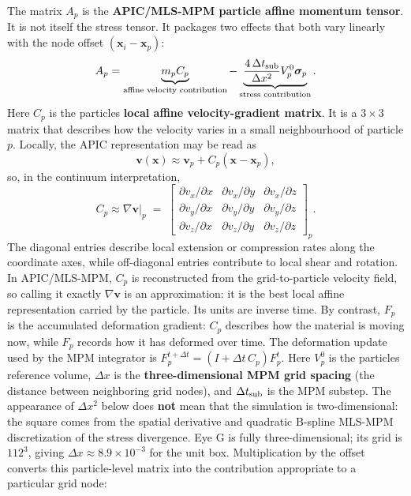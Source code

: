 \documentclass[11pt]{article}
\newcommand{\vect}[1]{\bm{#1}}
\newcommand{\sig}{\boldsymbol{\sigma}}
\begin{document}
The matrix $A_p$ is the \textbf{APIC/MLS-MPM particle affine momentum tensor}. It is not itself the stress tensor. It packages two effects that both vary linearly with the node offset $(\vect x_i-\vect x_p)$:
\begin{equation}
A_p=\underbrace{m_pC_p}_{\text{affine velocity contribution}}
-\underbrace{\frac{4\,\Delta t_{\rm sub}}{\Delta x^2}V_p^0\sig_p}_{\text{stress contribution}}.
\label{eq:affine-expanded}
\end{equation}
Here $C_p$ is the particle\textquotesingle s \textbf{local affine velocity-gradient matrix}. It is a $3\times3$ matrix that describes how the velocity varies in a small neighbourhood of particle $p$. Locally, the APIC representation may be read as
\begin{equation}
\mathbf v(\mathbf x) \approx \mathbf v_p + C_p(\mathbf x-\mathbf x_p),
\label{eq:apic-velocity}
\end{equation}
so, in the continuum interpretation,
\begin{equation}
C_p \approx \nabla\mathbf v\big|_p \;=\;\begin{bmatrix}
\partial v_x/\partial x & \partial v_x/\partial y & \partial v_x/\partial z\\[2pt]
\partial v_y/\partial x & \partial v_y/\partial y & \partial v_y/\partial z\\[2pt]
\partial v_z/\partial x & \partial v_z/\partial y & \partial v_z/\partial z
\end{bmatrix}_p .
\label{eq:velocity-gradient}
\end{equation}
The diagonal entries describe local extension or compression rates along the coordinate axes, while off-diagonal entries contribute to local shear and rotation. In APIC/MLS-MPM, $C_p$ is reconstructed from the grid-to-particle velocity field, so calling it exactly $\nabla\mathbf v$ is an approximation: it is the best local affine representation carried by the particle. Its units are inverse time. By contrast, $F_p$ is the accumulated deformation gradient: $C_p$ describes how the material is moving now, while $F_p$ records how it has deformed over time. The deformation update used by the MPM integrator is $F_p^{t+\Delta t}=(I+\Delta t\,C_p)F_p^t$. Here $V_p^0$ is the particle\textquotesingle s reference volume, $\Delta x$ is the \textbf{three-dimensional MPM grid spacing} (the distance between neighboring grid nodes), and $\Delta t_{\rm sub}$ is the MPM substep. The appearance of $\Delta x^2$ below does \textbf{not} mean that the simulation is two-dimensional: the square comes from the spatial derivative and quadratic B-spline MLS-MPM discretization of the stress divergence. Eye G is fully three-dimensional; its grid is $112^3$, giving $\Delta x\approx8.9\times10^{-3}$ for the unit box. Multiplication by the offset converts this particle-level matrix into the contribution appropriate to a particular grid node:
\end{document}
